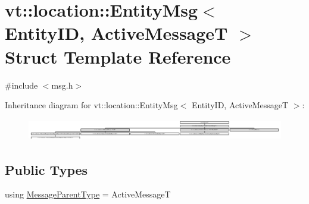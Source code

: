 \hypertarget{structvt_1_1location_1_1_entity_msg}{}\section{vt\+:\+:location\+:\+:Entity\+Msg$<$ Entity\+ID, Active\+MessageT $>$ Struct Template Reference}
\label{structvt_1_1location_1_1_entity_msg}


{\ttfamily \#include $<$msg.\+h$>$}

Inheritance diagram for vt\+:\+:location\+:\+:Entity\+Msg$<$ Entity\+ID, Active\+MessageT $>$\+:\begin{figure}[H]
\begin{center}
\leavevmode
\includegraphics[height=0.952381cm]{structvt_1_1location_1_1_entity_msg}
\end{center}
\end{figure}
\subsection*{Public Types}
\begin{DoxyCompactItemize}
\item 
using \hyperlink{structvt_1_1location_1_1_entity_msg_a186637100a628eb04cb00127f5579210}{Message\+Parent\+Type} = Active\+MessageT
\end{DoxyCompactItemize}
